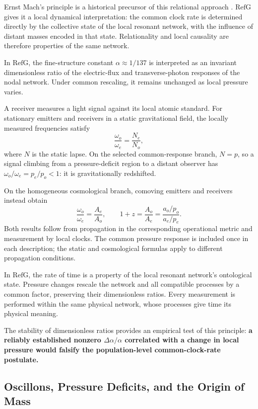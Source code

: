 \documentclass[11pt,a4paper]{article}
\newcommand{\RefG}{\mathrm{RefG}}
\begin{document}
Ernst Mach's principle is a historical precursor of this relational approach \citep{mach1883}. $\RefG$ gives it a local dynamical interpretation: the common clock rate is determined directly by the collective state of the local resonant network, with the influence of distant masses encoded in that state. Relationality and local causality are therefore properties of the same network.

In $\RefG$, the fine-structure constant $\alpha \approx 1/137$ is interpreted as an invariant dimensionless ratio of the electric-flux and transverse-photon responses of the nodal network. Under common rescaling, it remains unchanged as local pressure varies.

A receiver measures a light signal against its local atomic standard. For stationary emitters and receivers in a static gravitational field, the locally measured frequencies satisfy
\begin{equation}
\frac{\omega_o}{\omega_e}=\frac{N_e}{N_o},
\end{equation}
where $N$ is the static lapse. On the selected common-response branch, $N=p$, so a signal climbing from a pressure-deficit region to a distant observer has $\omega_o/\omega_e=p_e/p_o<1$: it is gravitationally redshifted.

On the homogeneous cosmological branch, comoving emitters and receivers instead obtain
\begin{equation}
\frac{\omega_o}{\omega_e}=\frac{A_e}{A_o},
\qquad
1+z=\frac{A_o}{A_e}=\frac{a_o/p_o}{a_e/p_e}.
\end{equation}
Both results follow from propagation in the corresponding operational metric and measurement by local clocks. The common pressure response is included once in each description; the static and cosmological formulas apply to different propagation conditions.

In $\RefG$, the rate of time is a property of the local resonant network's ontological state. Pressure changes rescale the network and all compatible processes by a common factor, preserving their dimensionless ratios. Every measurement is performed within the same physical network, whose processes give time its physical meaning.

The stability of dimensionless ratios provides an empirical test of this principle: \textbf{a reliably established nonzero $\Delta\alpha/\alpha$ correlated with a change in local pressure would falsify the population-level common-clock-rate postulate.}

\subsection{Oscillons, Pressure Deficits, and the Origin of Mass}
\end{document}
